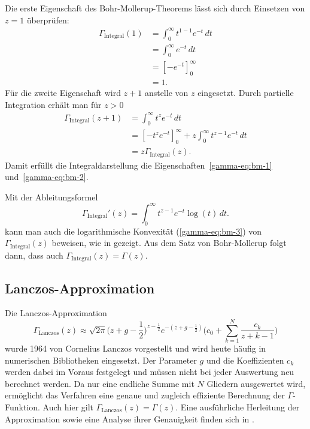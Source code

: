Die erste Eigenschaft des Bohr-Mollerup-Theorems lässt sich durch Einsetzen von $z=1$ überprüfen:
\begin{equation}
\label{gamma-eq:integral-first-property}
    \begin{split}
    \Gamma_{\text{Integral}}(1)
        &= \int_0^\infty t^{1-1}e^{-t}\,dt \\
        &= \int_0^\infty e^{-t}\,dt \\
        &= \left[-e^{-t}\right]_0^\infty \\
        &= 1.
    \end{split}
\end{equation}
Für die zweite Eigenschaft wird $z+1$ anstelle von $z$ eingesetzt. Durch partielle Integration erhält man für $z>0$
\begin{equation}
\label{gamma-eq:integral-recursive-property}
    \begin{split}
    \Gamma_{\text{Integral}}(z+1)
        &= \int_0^\infty t^z e^{-t}\,dt \\
        &= \left[-t^z e^{-t}\right]_0^\infty
            + z\int_0^\infty t^{z-1}e^{-t}\,dt \\
        &= z\Gamma_{\text{Integral}}(z).
    \end{split}
\end{equation}
Damit erfüllt die Integraldarstellung die Eigenschaften~\ref{gamma-eq:bm-1} und~\ref{gamma-eq:bm-2}.

Mit der Ableitungsformel 
\begin{equation}
    \Gamma_{\text{Integral}}'(z)=\int_0^\infty t^{z-1}e^{-t}\log(t)\,dt.
\end{equation}
kann man auch die logarithmische Konvexität (\ref{gamma-eq:bm-3}) von $\Gamma_{\text{Integral}}(z)$ beweisen, wie in \cite[Abschnitt 4.1.5]{buch:MatSeSspezielleFunktionen} gezeigt.
Aus dem Satz von Bohr-Mollerup folgt dann, dass auch $\Gamma_{\text{Integral}}(z)=\Gamma(z)$.

\subsection{Lanczos-Approximation}

Die Lanczos-Approximation
%
%
\begin{equation}
\label{gamma-eq:lanczos}
    \Gamma_{\text{Lanczos}}(z) \approx \sqrt{2\pi}
    \biggl(z + g - \frac{1}{2}\biggr)^{z - \frac{1}{2}}
    e^{-(z + g - \frac{1}{2})}
    \biggl(c_0 + \sum_{k=1}^{N} \frac{c_k}{z + k - 1}\biggr)
\end{equation}
wurde 1964 von Cornelius Lanczos vorgestellt und wird heute häufig in numerischen Bibliotheken eingesetzt.
%
Der Parameter $g$ und die Koeffizienten $c_k$ werden dabei im Voraus festgelegt und müssen nicht bei jeder Auswertung neu berechnet werden.
Da nur eine endliche Summe mit $N$ Gliedern ausgewertet wird, ermöglicht das Verfahren eine genaue und zugleich effiziente Berechnung der $\Gamma$-Funktion. 
Auch hier gilt $\Gamma_{\text{Lanczos}}(z) = \Gamma(z)$. 
Eine ausführliche Herleitung der Approximation sowie eine Analyse ihrer Genauigkeit finden sich in \cite{LanczosGammaApproximation}.
